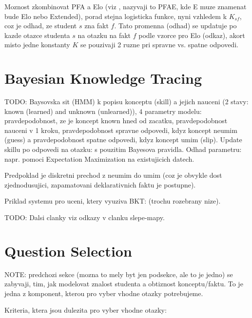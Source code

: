 \documentclass[a4paper, 12pt, twoside]{fithesis2}		%
\renewcommand{\_}{\leavevmode \kern0.07em\vbox{\hrule width0.4em}}
\begin{document}
Moznost zkombinovat PFA a Elo (viz \cite{slepe-mapy}, nazyvaji to PFAE, kde E muze znamenat bude Elo nebo Extended), porad stejna logisticka funkce, nyni vzhledem k $K_{sf}$, coz je odhad, ze student $s$ zna fakt $f$. Tato promenna (odhad) se updatuje po kazde otazce studenta $s$ na otazku na fakt $f$ podle vzorce pro Elo (odkaz), akort misto jedne konstanty $K$ se pouzivaji 2 ruzne pri spravne vs. spatne odpovedi.


\section{Bayesian Knowledge Tracing}
\label{sec:bayesian-network}

TODO: Baysovska sit (HMM) k popisu konceptu (skill) a jejich nauceni (2 stavy: known (learned) and unknown (unlearned)), 4 parametry modelu: pravdepodobnost, ze je koncept known hned od zacatku, pravdepodobnost nauceni v 1 kroku, pravdepodobnost spravne odpovedi, kdyz koncept neumim (guess) a pravdepodobnost spatne odpovedi, kdyz koncept umim (slip).
Update skillu po odpovedi na otazku: s pouzitim Bayesova pravidla.
Odhad parametru: napr. pomoci Expectation Maximization na existujicich datech.

Predpoklad je diskretni prechod z neumim do umim (coz je obvykle dost zjednodusujici, zapamatovani deklarativnich faktu je postupne).

Priklad systemu pro uceni, ktery vyuziva BKT: \cite{question-gen-adapt-bayes} (trochu rozebrany nize).

TODO: Dalsi clanky viz odkazy v clanku slepe-mapy.


\section{Question Selection}
\label{sec:question-selection}

NOTE: predchozi sekce (mozna to mely byt jen podsekce, ale to je jedno) se zabyvaji, tim, jak modelovat znalost studenta a obtiznost konceptu/faktu. To je jedna z komponent, kterou pro vyber vhodne otazky potrebujeme.

Kriteria, ktera jsou dulezita pro vyber vhodne otazky:
\end{document}

